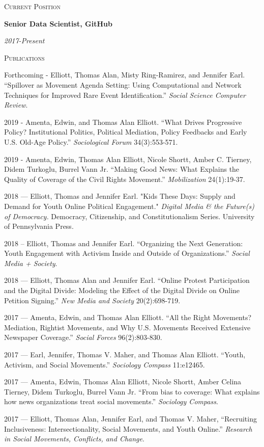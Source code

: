 \documentclass[11pt]{article}
\newcommand{\sectionheader}[1]{
{\Large
\textsc{#1}}
}
\newcommand{\resumeitem}[2]{
\begin{minipage}{0.7\textwidth}
\begin{flushleft}
\textbf{#1}
\end{flushleft}
\end{minipage}
\begin{minipage}{0.3\textwidth}
\begin{flushright}
\emph{#2}
\end{flushright}
\end{minipage}
\hangindent=0.05\textwidth
}
\begin{document}
\sectionheader{Current Position}

\resumeitem{Senior Data Scientist, GitHub}{2017-Present}


\sectionheader{Publications}

Forthcoming - Elliott, Thomas Alan, Misty Ring-Ramirez, and Jennifer Earl. ``Spillover as Movement Agenda Setting: Using Computational and Network Techniques for Improved Rare Event Identification.'' \textit{Social Science Computer Review}.


2019 - Amenta, Edwin, and Thomas Alan Elliott. ``What Drives Progressive Policy? Institutional Politics, Political Mediation, Policy Feedbacks and Early U.S. Old-Age Policy.'' \textit{Sociological Forum} 34(3):553-571. 

2019 - Amenta, Edwin, Thomas Alan Elliott, Nicole Shortt, Amber C. Tierney, Didem Turkoglu, Burrel Vann Jr. ``Making Good News: What Explains the Quality of Coverage of the Civil Rights Movement.'' \textit{Mobilization} 24(1):19-37.

2018 --- Elliott, Thomas and Jennifer Earl. "Kids These Days: Supply and Demand for Youth Online Political Engagement." \textit{Digital Media \& the Future(s) of Democracy.} Democracy, Citizenship, and Constitutionalism Series. University of Pennsylvania Press.

2018 -- Elliott, Thomas and Jennifer Earl. ``Organizing the Next Generation: Youth Engagement with Activism Inside and Outside of Organizations.'' \textit{Social Media + Society}.

2018 --- Elliott, Thomas Alan and Jennifer Earl. ``Online Protest Participation and the Digital Divide: Modeling the Effect of the Digital Divide on Online Petition Signing.'' \textit{New Media and Society} 20(2):698-719.

2017 --- Amenta, Edwin, and Thomas Alan Elliott. ``All the Right Movements?
Mediation, Rightist Movements, and Why U.S. Movements Received Extensive Newspaper Coverage.'' \textit{Social Forces} 96(2):803-830. 

2017 --- Earl, Jennifer, Thomas V. Maher, and Thomas Alan Elliott. ``Youth, Activism, and Social Movements.'' \textit{Sociology Compass} 11:e12465.

2017 --- Amenta, Edwin, Thomas Alan Elliott, Nicole Shortt, Amber Celina Tierney, Didem Turkoglu, Burrel Vann Jr. ``From bias to coverage: What explains how news organizations treat social movements.'' \textit{Sociology Compass}. 

2017 --- Elliott, Thomas Alan, Jennifer Earl, and Thomas V. Maher, ``Recruiting Inclusiveness: Intersectionality, Social Movements, and Youth Online.'' \textit{Research in Social Movements, Conflicts, and Change}.
\end{document}
